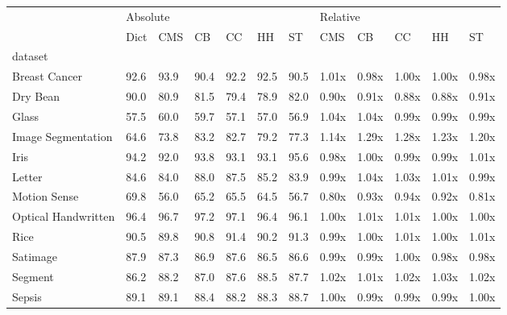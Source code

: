 \begin{tabular}{llllllllllll}
\toprule
{} & \multicolumn{6}{l}{Absolute} & \multicolumn{5}{l}{Relative} \\
{} &     Dict &   CMS &    CB &    CC &    HH &    ST &      CMS &     CB &     CC &     HH &     ST \\
dataset             &          &       &       &       &       &       &          &        &        &        &        \\
\midrule
Breast Cancer       &     92.6 &  93.9 &  90.4 &  92.2 &  92.5 &  90.5 &    1.01x &  0.98x &  1.00x &  1.00x &  0.98x \\
Dry Bean            &     90.0 &  80.9 &  81.5 &  79.4 &  78.9 &  82.0 &    0.90x &  0.91x &  0.88x &  0.88x &  0.91x \\
Glass               &     57.5 &  60.0 &  59.7 &  57.1 &  57.0 &  56.9 &    1.04x &  1.04x &  0.99x &  0.99x &  0.99x \\
Image Segmentation  &     64.6 &  73.8 &  83.2 &  82.7 &  79.2 &  77.3 &    1.14x &  1.29x &  1.28x &  1.23x &  1.20x \\
Iris                &     94.2 &  92.0 &  93.8 &  93.1 &  93.1 &  95.6 &    0.98x &  1.00x &  0.99x &  0.99x &  1.01x \\
Letter              &     84.6 &  84.0 &  88.0 &  87.5 &  85.2 &  83.9 &    0.99x &  1.04x &  1.03x &  1.01x &  0.99x \\
Motion Sense        &     69.8 &  56.0 &  65.2 &  65.5 &  64.5 &  56.7 &    0.80x &  0.93x &  0.94x &  0.92x &  0.81x \\
Optical Handwritten &     96.4 &  96.7 &  97.2 &  97.1 &  96.4 &  96.1 &    1.00x &  1.01x &  1.01x &  1.00x &  1.00x \\
Rice                &     90.5 &  89.8 &  90.8 &  91.4 &  90.2 &  91.3 &    0.99x &  1.00x &  1.01x &  1.00x &  1.01x \\
Satimage            &     87.9 &  87.3 &  86.9 &  87.6 &  86.5 &  86.6 &    0.99x &  0.99x &  1.00x &  0.98x &  0.98x \\
Segment             &     86.2 &  88.2 &  87.0 &  87.6 &  88.5 &  87.7 &    1.02x &  1.01x &  1.02x &  1.03x &  1.02x \\
Sepsis              &     89.1 &  89.1 &  88.4 &  88.2 &  88.3 &  88.7 &    1.00x &  0.99x &  0.99x &  0.99x &  1.00x \\

\end{tabular}
